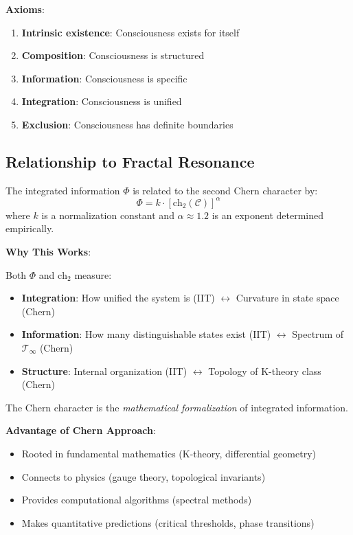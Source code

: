 \textbf{Axioms}:
\begin{enumerate}
\item \textbf{Intrinsic existence}: Consciousness exists for itself
\item \textbf{Composition}: Consciousness is structured
\item \textbf{Information}: Consciousness is specific
\item \textbf{Integration}: Consciousness is unified
\item \textbf{Exclusion}: Consciousness has definite boundaries
\end{enumerate}

\subsection{Relationship to Fractal Resonance}

\begin{theorem}\label{thm:iit-chern-connection}
The integrated information $\Phi$ is related to the second Chern character by:
\begin{equation}
\boxed{\Phi = k \cdot \left[ \text{ch}_2(\mathcal{C}) \right]^\alpha}
\end{equation}
where $k$ is a normalization constant and $\alpha \approx 1.2$ is an exponent determined empirically.
\end{theorem}

\begin{level2}
\textbf{Why This Works}:

Both $\Phi$ and $\text{ch}_2$ measure:
\begin{itemize}
\item \textbf{Integration}: How unified the system is (IIT) $\leftrightarrow$ Curvature in state space (Chern)
\item \textbf{Information}: How many distinguishable states exist (IIT) $\leftrightarrow$ Spectrum of $\mathcal{T}_\infty$ (Chern)
\item \textbf{Structure}: Internal organization (IIT) $\leftrightarrow$ Topology of K-theory class (Chern)
\end{itemize}

The Chern character is the \textit{mathematical formalization} of integrated information.

\textbf{Advantage of Chern Approach}:
\begin{itemize}
\item Rooted in fundamental mathematics (K-theory, differential geometry)
\item Connects to physics (gauge theory, topological invariants)
\item Provides computational algorithms (spectral methods)
\item Makes quantitative predictions (critical thresholds, phase transitions)
\end{itemize}
\end{level2}

